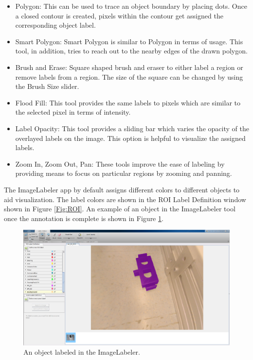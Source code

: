 	\begin{itemize}
		\item Polygon: This can be used to trace an object boundary by placing dots. Once a closed contour is created, pixels within the contour get assigned the corresponding object label.
		\item Smart Polygon: Smart Polygon is similar to Polygon in terms of usage. This tool, in addition, tries to reach out to the nearby edges of the drawn polygon.
		\item Brush and Erase: Square shaped brush and eraser to either label a region or remove labels from a region. The size of the square can be changed by using the Brush Size slider.
		\item Flood Fill: This tool provides the same labels to pixels which are similar to the selected pixel in terms of intensity.
		\item Label Opacity: This tool provides a sliding bar which varies the opacity of the overlayed labels on the image. This option is helpful to visualize the assigned labels.
		\item Zoom In, Zoom Out, Pan: These tools improve the ease of labeling by providing means to focus on particular regions by zooming and panning.
	\end{itemize}
	
The ImageLabeler app by default assigns different colors to different objects to aid visualization. The label colors are shown in the ROI Label Definition window shown in Figure \ref{Fig:ROI}. An example of an object in the ImageLabeler tool once the annotation is complete is shown in Figure \ref{Fig:ex_ann}.
	
	\begin{figure}
		\centering
		\includegraphics[scale=0.2]{images/imglabler_eg}
		\caption{An object labeled in the ImageLabeler.}
		\label{Fig:ex_ann}
	\end{figure}
	
